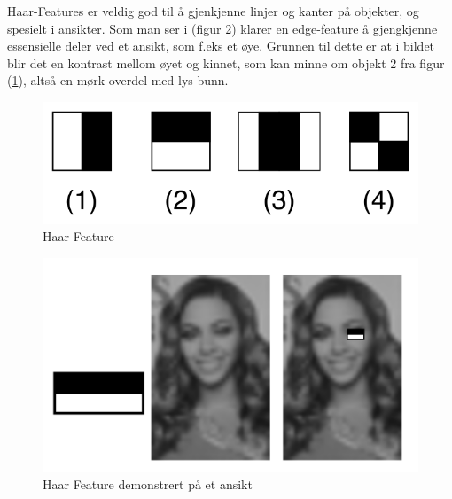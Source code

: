 Haar-Features er veldig god til å gjenkjenne linjer og kanter på objekter, og spesielt i ansikter. Som man ser i (figur \ref{fig:haarface}) klarer en edge-feature å gjengkjenne essensielle deler ved et ansikt, som f.eks et øye. Grunnen til dette er at i bildet blir det en kontrast mellom øyet og kinnet, som kan minne om objekt 2 fra figur (\ref{fig:haarfeat}), altså en mørk overdel med lys bunn.

\begin{figure}
\begin{center}
    \includegraphics[width=0.4\columnwidth]{bilder/Anonymisering/VJ_featureTypes.svg.png}
     \caption{Haar Feature\label{fig:haarfeat}} 
\end{center}
\end{figure}

\begin{figure}
\begin{center}
    \includegraphics[width=0.5\columnwidth]{bilder/Anonymisering/haarface-example.png}
     \caption{Haar Feature demonstrert på et ansikt \label{fig:haarface}} 
\end{center}
\end{figure}
 
